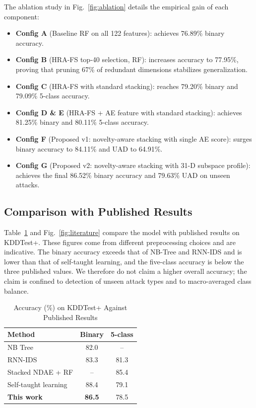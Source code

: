 \documentclass[journal]{IEEEtran}
\begin{document}
The ablation study in Fig.~\ref{fig:ablation} details the empirical gain of each component:
\begin{itemize}
\item \textbf{Config A} (Baseline RF on all 122 features): achieves 76.89\% binary accuracy.
\item \textbf{Config B} (HRA-FS top-40 selection, RF): increases accuracy to 77.95\%, proving that pruning 67\% of redundant dimensions stabilizes generalization.
\item \textbf{Config C} (HRA-FS with standard stacking): reaches 79.20\% binary and 79.09\% 5-class accuracy.
\item \textbf{Config D \& E} (HRA-FS + AE feature with standard stacking): achieves 81.25\% binary and 80.11\% 5-class accuracy.
\item \textbf{Config F} (Proposed v1: novelty-aware stacking with single AE score): surges binary accuracy to 84.11\% and UAD to 64.91\%.
\item \textbf{Config G} (Proposed v2: novelty-aware stacking with 31-D subspace profile): achieves the final 86.52\% binary accuracy and 79.63\% UAD on unseen attacks.
\end{itemize}

\subsection{Comparison with Published Results}
Table~\ref{tab:published} and Fig.~\ref{fig:literature} compare the model with published results on KDDTest+. These figures come from different preprocessing choices and are indicative. The binary accuracy exceeds that of NB-Tree and RNN-IDS and is lower than that of self-taught learning, and the five-class accuracy is below the three published values. We therefore do not claim a higher overall accuracy; the claim is confined to detection of unseen attack types and to macro-averaged class balance.

\begin{table}[!t]
\centering
\caption{Accuracy (\%) on KDDTest+ Against Published Results}
\label{tab:published}
\footnotesize
\begin{tabular}{lcc}
\toprule
Method & Binary & 5-class \\
\midrule
NB Tree \cite{tavallaee2009} & 82.0 & -- \\
RNN-IDS \cite{yin2017} & 83.3 & 81.3 \\
Stacked NDAE + RF \cite{shone2018} & -- & 85.4 \\
Self-taught learning \cite{javaid2016} & 88.4 & 79.1 \\
\textbf{This work} & \textbf{86.5} & 78.5 \\
\bottomrule
\end{tabular}
\end{table}
\end{document}
